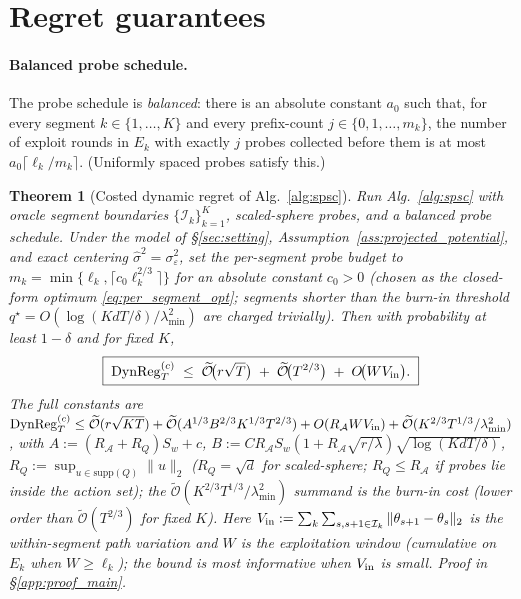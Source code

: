 \documentclass{article}
\newcommand{\cA}{\mathcal{A}}
\newcommand{\cI}{\mathcal{I}}
\newcommand{\tilO}{\widetilde{\mathcal{O}}}
\newcommand{\DynReg}{\mathrm{DynReg}}
\newtheorem{theorem}{Theorem}
\begin{document}
\section{Regret guarantees}
\label{sec:theory}

\paragraph{Balanced probe schedule.} The probe schedule is
\emph{balanced}: there is an absolute constant $a_0$ such that, for
every segment $k\in\{1,\dots,K\}$ and every prefix-count
$j\in\{0,1,\dots,m_k\}$, the number of exploit rounds in $E_k$ with
exactly $j$ probes collected before them is at most
$a_0\lceil\ell_k/m_k\rceil$. (Uniformly spaced probes satisfy this.)

\begin{theorem}[Costed dynamic regret of Alg.~\ref{alg:spsc}]
\label{thm:spsc_regret}
Run Alg.~\ref{alg:spsc} with oracle segment boundaries
$\{\cI_k\}_{k=1}^K$, scaled-sphere probes, and a balanced probe
schedule. Under the model of \S\ref{sec:setting},
Assumption~\ref{ass:projected_potential}, and exact centering
$\widehat\sigma^2=\sigma_\varepsilon^2$, set the per-segment probe
budget to $m_k=\min\{\ell_k,\lceil c_0\ell_k^{2/3}\rceil\}$ for an
absolute constant $c_0>0$ (chosen as the closed-form optimum
\eqref{eq:per_segment_opt}; segments shorter than the burn-in
threshold $q^\star=O(\log(KdT/\delta)/\lambda_{\min}^2)$ are charged
trivially). Then with probability at least $1-\delta$ and for
fixed $K$,
\begin{equation}
\boxed{\;
\DynReg_T^{(c)} \;\le\; \tilO\!\bigl(r\sqrt{T}\bigr) \;+\; \tilO\!\bigl(T^{2/3}\bigr) \;+\; O\!\bigl(W V_{\rm in}\bigr).\;}
\label{eq:main_bound}
\end{equation}
The full constants are
$\DynReg_T^{(c)} \le \tilO(r\sqrt{KT}) + \tilO(A^{1/3}B^{2/3}K^{1/3}T^{2/3}) + O(R_\cA W V_{\rm in}) + \tilO(K^{2/3}T^{1/3}/\lambda_{\min}^2)$,
with $A:=(R_\cA+R_Q)S_w+c$,
$B:=C R_\cA S_w(1+R_\cA\sqrt{r/\lambda})\sqrt{\log(KdT/\delta)}$,
$R_Q:=\sup_{u\in\mathrm{supp}(Q)}\|u\|_2$ ($R_Q=\sqrt d$ for
scaled-sphere; $R_Q\le R_\cA$ if probes lie inside the action set);
the $\tilO(K^{2/3}T^{1/3}/\lambda_{\min}^2)$ summand is the burn-in
cost (lower order than $\tilO(T^{2/3})$ for fixed $K$). Here
$V_{\rm in}:=\sum_k\sum_{s,s+1\in\cI_k}\|\theta_{s+1}-\theta_s\|_2$
is the within-segment path variation and $W$ is the exploitation
window (cumulative on $E_k$ when $W\ge\ell_k$); the bound is most
informative when $V_{\rm in}$ is small. Proof in
\S\ref{app:proof_main}.
\end{theorem}
\end{document}
